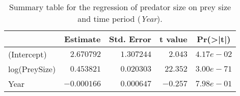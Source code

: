 \begin{table}[!htbp]
\caption{Summary table for the regression of predator size 
  on prey size and 
  time period (\textit{Year}).\label{tab:SizeY}} 
\begin{center}
\begin{tabular}{lrrrr}
\hline
\multicolumn{1}{l}{}&\multicolumn{1}{c}{Estimate}&\multicolumn{1}{c}{Std. Error}&\multicolumn{1}{c}{t value}&\multicolumn{1}{c}{Pr(\textgreater |t|)}\tabularnewline
\hline
(Intercept)&$ 2.670792$&$1.307244$&$ 2.043$&$4.17e-02$\tabularnewline
log(PreySize)&$ 0.453821$&$0.020303$&$22.352$&$3.00e-71$\tabularnewline
Year&$-0.000166$&$0.000647$&$-0.257$&$7.98e-01$\tabularnewline
\hline
\end{tabular}\end{center}
\end{table}
